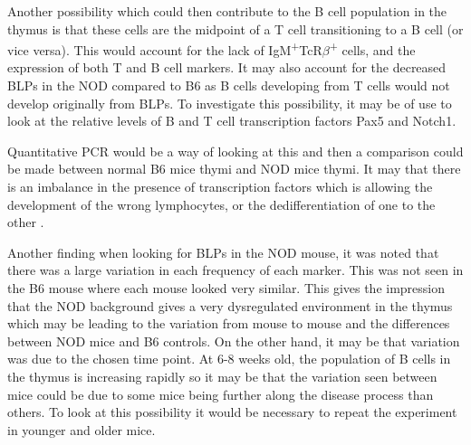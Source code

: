 Another possibility which could then contribute to the B cell population in the thymus is that these cells are the midpoint of a T cell transitioning to a B cell (or vice versa).
This would account for the lack of IgM\textsuperscript{+}TcR$\beta$\textsuperscript{+} cells, and the expression of both T and B cell markers.
It may also account for the decreased BLPs in the NOD compared to B6 as B cells developing from T cells would not develop originally from BLPs.
To investigate this possibility, it may be of use to look at the relative levels of B and T cell transcription factors Pax5 and Notch1.

Quantitative PCR would be a way of looking at this and then a comparison could be made between normal B6 mice thymi and NOD mice thymi.
It may that there is an imbalance in the presence of transcription factors which is allowing the development of the wrong lymphocytes, or the dedifferentiation of one to the other \citep{Cobaleda2007}.

Another finding when looking for BLPs in the NOD mouse, it was noted that there was a large variation in each frequency of each marker.
This was not seen in the B6 mouse where each mouse looked very similar.
This gives the impression that the NOD background gives a very dysregulated environment in the thymus which may be leading to the variation from mouse to mouse and the differences between NOD mice and B6 controls.
On the other hand, it may be that variation was due to the chosen time point. 
At 6-8 weeks old, the population of B cells in the thymus is increasing rapidly so it may be that the variation seen between mice could be due to some mice being further along the disease process than others.
To look at this possibility it would be necessary to repeat the experiment in younger and older mice.



